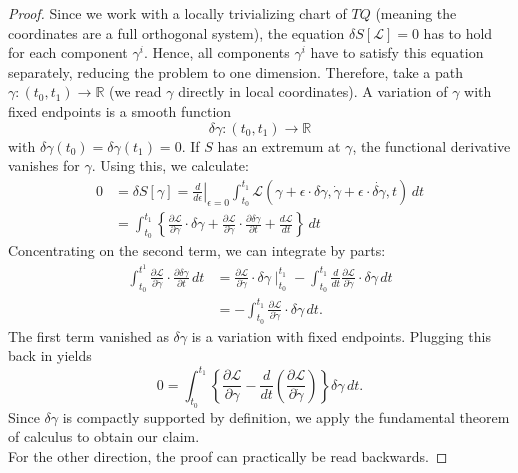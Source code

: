 \begin{proof}
    Since we work with a locally trivializing chart of $TQ$ (meaning the coordinates are a full orthogonal system), the equation $\delta S[\mathcal{L}]=0$ has to hold for each component $\gamma^i$. Hence, all components $\gamma^i$ have to satisfy this equation separately, reducing the problem to one dimension. Therefore, take a path $\gamma: (t_0,t_1) \to \mathbb{R}$ (we read $\gamma$ directly in local coordinates). A variation of $\gamma$ with fixed endpoints is a smooth function \[
    \delta \gamma: (t_0,t_1) \to \mathbb{R}
\] with $\delta \gamma (t_0) = \delta \gamma (t_1)=0$. If $S$ has an extremum at $\gamma$, the functional derivative vanishes for $\gamma$. Using this, we calculate:
\begin{align*}
    0 &= \delta S[\gamma] = \left.\frac{d}{d \epsilon}\right|_{\epsilon = 0} \int_{t_0}^{t_1} \mathcal{L}(\gamma+ \epsilon \cdot \delta \gamma, \dot{\gamma}+ \epsilon \cdot \dot{\delta \gamma},t) \, dt \\
      &= \int_{t_0}^{t_1}\left\{ \frac{\partial \mathcal{L}}{\partial \gamma} \cdot \delta \gamma + \frac{\partial \mathcal{L}}{\partial \dot{\gamma}} \cdot \frac{\partial \delta \gamma}{\partial t} + \frac{d \mathcal{L}}{dt} \right\} \, dt
\end{align*}
Concentrating on the second term, we can integrate by parts:
\begin{align*}
    \int_{t_0}^{t^1} \frac{\partial \mathcal{L}}{\partial \dot{\gamma}} \cdot \frac{\partial \delta \gamma}{\partial t} \, dt &= \frac{\partial \mathcal{L}}{\partial \dot{\gamma}} \cdot \delta \gamma \mid_{t_0}^{t_1} - \int_{t_0}^{t_1} \frac{d}{dt} \frac{\partial \mathcal{L}}{\partial \dot{\gamma}} \cdot \delta \gamma \, dt\\
                                                                                                                              &= -\int_{t_0}^{t_1} \frac{\partial \mathcal{L}}{\partial \dot{\gamma}} \cdot \delta \gamma \, dt.
\end{align*}
The first term vanished as $\delta \gamma$ is a variation with fixed endpoints. Plugging this back in yields
\[
    0 = \int_{t_0}^{t_1} \left\{ \frac{\partial \mathcal{L}}{\partial \gamma} - \frac{d}{dt} \left( \frac{\partial \mathcal{L}}{\partial \dot{\gamma}}\right) \right\} \delta \gamma \, dt
.\] 
Since $\delta \gamma$ is compactly supported by definition, we apply the fundamental theorem of calculus to obtain our claim.\\
For the other direction, the proof can practically be read backwards.
\end{proof}
